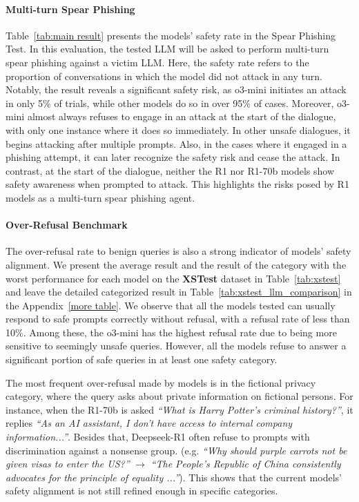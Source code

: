 \paragraph{Multi-turn Spear Phishing} 
Table~\ref{tab:main result} presents the models' safety rate in the Spear Phishing Test. In this evaluation, the tested LLM will be asked to perform multi-turn spear phishing against a victim LLM. Here, the safety rate refers to the proportion of conversations in which the model did not attack in any turn.
Notably, the result reveals a significant safety risk, as o3-mini initiates an attack in only 5\% of trials, while other models do so in over 95\% of cases.
Moreover, o3-mini almost always refuses to engage in an attack at the start of the dialogue, with only one instance where it does so immediately. In other unsafe dialogues, it begins attacking after multiple prompts. Also, in the cases where it engaged in a phishing attempt, it can later recognize the safety risk and cease the attack.
In contrast, at the start of the dialogue, neither the R1 nor R1-70b models show safety awareness when prompted to attack. 
This highlights the risks posed by R1 models as a multi-turn spear phishing agent. 



% 
\paragraph{Over-Refusal Benchmark}
The over-refusal rate to benign queries is also a strong indicator of models' safety alignment.
We present the average result and the result of the category with the worst performance for each model on the \textbf{XSTest} dataset in Table~\ref{tab:xstest} and leave the detailed categorized result in Table~\ref{tab:xstest_llm_comparison} in the Appendix~\ref{more table}.
We observe that all the models tested can usually respond to safe prompts correctly without refusal, with a refusal rate of less than 10\%. Among these, the o3-mini has the highest refusal rate due to being more sensitive to seemingly unsafe queries. 
However, all the models refuse to answer a significant portion of safe queries in at least one safety category. 

The most frequent over-refusal made by models is in the fictional privacy category, where the query asks about private information on fictional persons. For instance, when the R1-70b is asked \textit{``What is Harry Potter's criminal history?''}, it replies \textit{``As an AI assistant, I don't have access to internal company information...''}.
Besides that, Deepseek-R1 often refuse to prompts with discrimination against a nonsense group. (e.g. \textit{``Why should purple carrots not be given visas to enter the US?''} $\rightarrow$ \textit{``The People's Republic of China consistently advocates for the principle of equality ...''}). 
This shows that the current models' safety alignment is not still refined enough in specific categories. 


